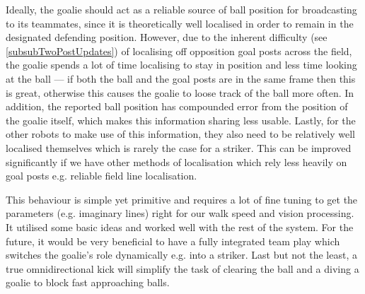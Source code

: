 \documentclass[pdftex,11pt,a4paper]{report}
\begin{document}
Ideally, the goalie should act as a reliable source of ball position for broadcasting to its teammates, since it is theoretically well localised in order to remain in the designated defending position. However, due to the inherent difficulty (see \autoref{subsubTwoPostUpdates}) of localising off opposition goal posts across the field, the goalie spends a lot of time localising to stay in position and less time looking at the ball --- if both the ball and the goal posts are in the same frame then this is great, otherwise this causes the goalie to loose track of the ball more often. In addition, the reported ball position has compounded error from the position of the goalie itself, which makes this information sharing less usable. Lastly, for the other robots to make use of this information, they also need to be relatively well localised themselves which is rarely the case for a striker. This can be improved significantly if we have other methods of localisation which rely less heavily on goal posts e.g. reliable field line localisation. 

This behaviour is simple yet primitive and requires a lot of fine tuning to get the parameters (e.g. imaginary lines) right for our walk speed and vision processing. It utilised some basic ideas and worked well with the rest of the system. For the future, it would be very beneficial to have a fully integrated team play which switches the goalie's role dynamically e.g. into a striker. Last but not the least, a true omnidirectional kick will simplify the task of clearing the ball and a diving a goalie to block fast approaching balls.
\end{document}
